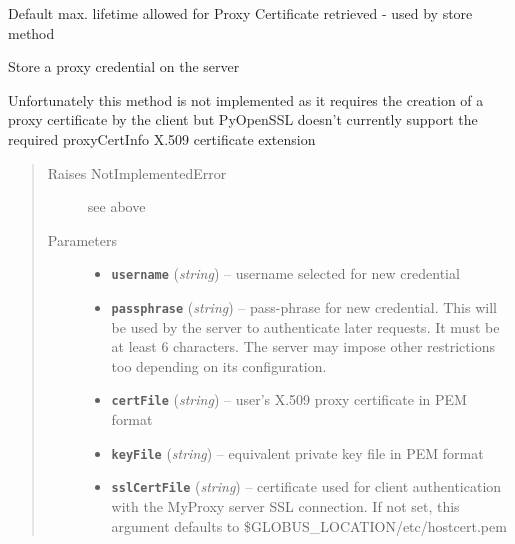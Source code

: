 \documentclass[letterpaper,10pt,english]{sphinxmanual}
\begin{document}
\begin{fulllineitems}
\begin{fulllineitems}
\label{client:myproxy.client.MyProxyClient.proxyCertMaxLifetime}
Default max. lifetime allowed for Proxy Certificate retrieved - used by store method

\end{fulllineitems}


\begin{fulllineitems}
\label{client:myproxy.client.MyProxyClient.put}
Store a proxy credential on the server

Unfortunately this method is not implemented as it requires the creation
of a proxy certificate by the client but PyOpenSSL doesn't currently 
support the required proxyCertInfo X.509 certificate extension
\begin{quote}\begin{description}
\item[{Raises NotImplementedError}] \leavevmode
see above

\item[{Parameters}] \leavevmode\begin{itemize}
\item {} 
\textbf{\texttt{username}} (\emph{string}) -- username selected for new credential

\item {} 
\textbf{\texttt{passphrase}} (\emph{string}) -- pass-phrase for new credential.  This will be used by the server to authenticate later requests.  It must be at least 6 characters.  The server may impose other restrictions too depending on its configuration.

\item {} 
\textbf{\texttt{certFile}} (\emph{string}) -- user's X.509 proxy certificate in PEM format

\item {} 
\textbf{\texttt{keyFile}} (\emph{string}) -- equivalent private key file in PEM format

\item {} 
\textbf{\texttt{sslCertFile}} (\emph{string}) -- certificate used for client authentication with the MyProxy server SSL connection.  If not set, this argument defaults to \$GLOBUS\_LOCATION/etc/hostcert.pem


\end{itemize}
\end{description}
\end{quote}
\end{fulllineitems}
\end{fulllineitems}
\end{document}
